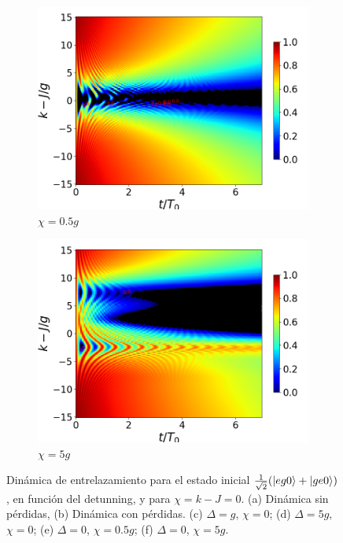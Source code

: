 \begin{figure}[h!]
    \vfill
    \begin{subfigure}{0.49\textwidth}
        \includegraphics[width=\textwidth]{figuras/ch4/concu/k/eg1+ge1 d=0.0g x=0.5g J=15.0g gamma=0.25g concu k dis.png}
        \caption{$\chi=0.5g$}
        \label{fig4:concu k 1 x1}
    \end{subfigure}
    \hfill
    \begin{subfigure}{0.49\textwidth}
        \includegraphics[width=\textwidth]{figuras/ch4/concu/k/eg1+ge1 d=0.0g x=5.0g J=15.0g gamma=0.25g concu k dis.png}
        \caption{$\chi=5g$}
        \label{fig4:concu k 1 x2}
    \end{subfigure}
    \caption{Dinámica de entrelazamiento para el estado inicial $\frac{1}{\sqrt{2}}(\ket{eg0}+\ket{ge0})$, en función del detunning, y para $\chi=k-J=0$. (a) Dinámica sin pérdidas, (b) Dinámica con pérdidas. (c) $\Delta=g$, $\chi=0$; (d) $\Delta=5g$, $\chi=0$; (e) $\Delta=0$, $\chi=0.5g$; (f) $\Delta=0$, $\chi=5g$.}
    \label{fig4:concu k 1}
\end{figure}
